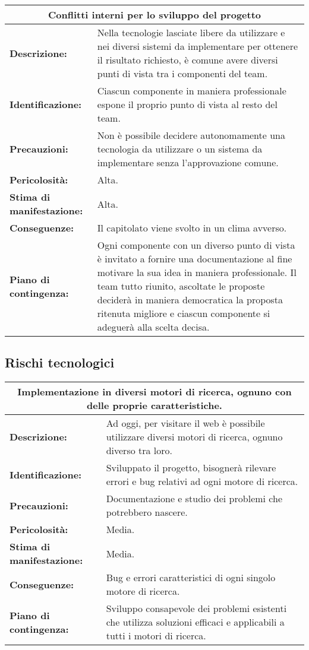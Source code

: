 \begin{tabular}{ |p{4cm}|p{10cm}|}
\hline
\multicolumn{2}{|c|}{\textbf{Conflitti interni per lo sviluppo del progetto}} \\
\hline
\textbf{Descrizione:}& Nella tecnologie lasciate libere da utilizzare e nei diversi sistemi da implementare per ottenere il risultato richiesto, è comune avere diversi punti di vista tra i componenti del team.\\
\hline
\textbf{Identificazione:}& Ciascun componente in maniera professionale espone il proprio punto di vista al resto del team.\\
\hline
\textbf{Precauzioni:}& Non è possibile decidere autonomamente una tecnologia da utilizzare o un sistema da implementare senza l'approvazione comune.\\
\hline
\textbf{Pericolosità:}& Alta.\\
\hline
\textbf{Stima di manifestazione:}& Alta.\\
\hline
\textbf{Conseguenze:}& Il capitolato viene svolto in un clima avverso.\\
\hline
\textbf{Piano di contingenza:}& Ogni componente con un diverso punto di vista è invitato a fornire una documentazione al fine motivare la sua idea in maniera professionale. Il team tutto riunito, ascoltate le proposte deciderà in maniera democratica la proposta ritenuta migliore e ciascun componente si adeguerà alla scelta decisa.\\
\hline
\end{tabular}

\subsection{Rischi tecnologici}

\begin{tabular}{ |p{4cm}|p{10cm}|}
\hline
\multicolumn{2}{|c|}{\textbf{Implementazione in diversi motori di ricerca, ognuno con delle proprie caratteristiche.}} \\
\hline
\textbf{Descrizione:}& Ad oggi, per visitare il web è possibile utilizzare diversi motori di ricerca, ognuno diverso tra loro.\\
\hline
\textbf{Identificazione:}& Sviluppato il progetto, bisognerà rilevare errori e bug relativi ad ogni motore di ricerca.\\
\hline
\textbf{Precauzioni:}& Documentazione e studio dei problemi che potrebbero nascere.\\
\hline
\textbf{Pericolosità:}& Media.\\
\hline
\textbf{Stima di manifestazione:}& Media.\\
\hline
\textbf{Conseguenze:}& Bug e errori caratteristici di ogni singolo motore di ricerca.\\
\hline
\textbf{Piano di contingenza:}& Sviluppo consapevole dei problemi esistenti che utilizza soluzioni efficaci e applicabili a tutti i motori di ricerca.\\
\hline
\end{tabular}

